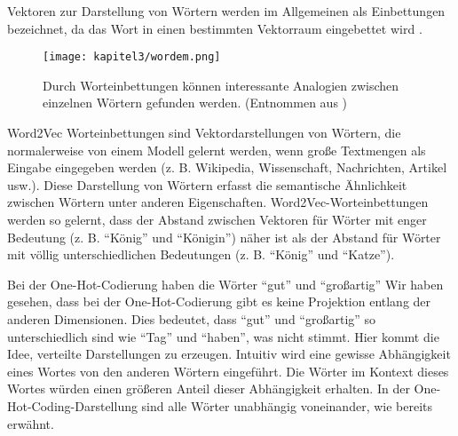 Vektoren zur Darstellung von Wörtern werden im Allgemeinen als Einbettungen bezeichnet, da das Wort in einen bestimmten Vektorraum eingebettet wird \cite*[99]{Jurafskya}.



\begin{figure}[H]
    \centering
    \texttt{[image: kapitel3/wordem.png]}
    \caption[Worteinbettungen erzeugen Analogien zwischen Wörtern]{Durch Worteinbettungen können interessante Analogien zwischen einzelnen Wörtern gefunden werden. (Entnommen aus \cite*{wordemdgood})}
    \label{Word2Vex}
\end{figure}


Word2Vec \cite*{Mikolov2013} Worteinbettungen sind Vektordarstellungen von Wörtern, die normalerweise von einem Modell gelernt werden, wenn große Textmengen als Eingabe eingegeben werden (z. B. Wikipedia, Wissenschaft, Nachrichten, Artikel usw.). Diese Darstellung von Wörtern erfasst die semantische Ähnlichkeit zwischen Wörtern unter anderen Eigenschaften. Word2Vec-Worteinbettungen werden so gelernt, dass der Abstand zwischen Vektoren für Wörter mit enger Bedeutung (z. B. \enquote{König} und \enquote{Königin}) näher ist als der Abstand für Wörter mit völlig unterschiedlichen Bedeutungen (z. B. \enquote{König} und \enquote{Katze}).

Bei der One-Hot-Codierung haben die Wörter \enquote{gut} und \enquote{großartig}
Wir haben gesehen, dass bei der One-Hot-Codierung gibt es keine Projektion entlang der anderen Dimensionen. Dies bedeutet, dass \enquote{gut} und \enquote{großartig} so unterschiedlich sind wie \enquote{Tag} und \enquote{haben}, was nicht stimmt. Hier kommt die Idee, verteilte Darstellungen zu erzeugen. Intuitiv wird eine gewisse Abhängigkeit eines Wortes von den anderen Wörtern eingeführt. Die Wörter im Kontext dieses Wortes würden einen größeren Anteil dieser Abhängigkeit erhalten. In der One-Hot-Coding-Darstellung sind alle Wörter unabhängig voneinander, wie bereits erwähnt.





